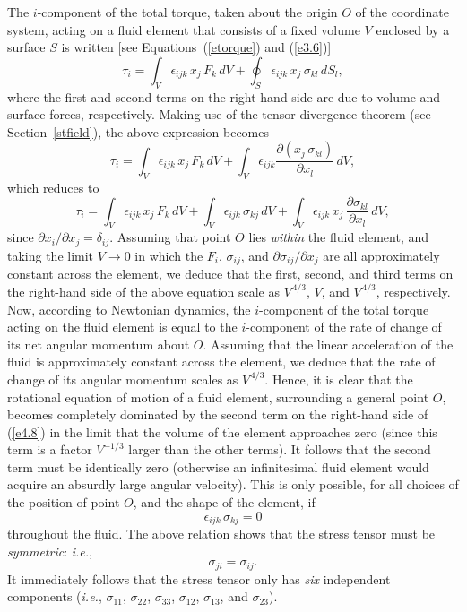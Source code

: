  The $i$-component of the total torque, taken about the origin $O$ of the coordinate system, acting on a fluid element that consists of
 a fixed volume $V$ enclosed by a surface $S$ is written  [see Equations~(\ref{etorque}) and (\ref{e3.6})]
 \begin{equation}
 \tau_i =\int_V \epsilon_{ijk}\,x_j\,F_k\,dV + \oint_S\epsilon_{ijk}\,x_j\,\sigma_{kl}\,dS_l,
 \end{equation}
 where the first and second terms on the right-hand side are due to volume and surface forces, respectively. 
Making use of the tensor divergence theorem (see Section~\ref{stfield}),
 the above expression becomes
 \begin{equation}
 \tau_i = \int_V \epsilon_{ijk}\,x_j\,F_k\,dV + \int_V \epsilon_{ijk}\frac{\partial (x_j\,\sigma_{kl})}{\partial x_l}\,dV,
 \end{equation}
 which reduces to
 \begin{equation}\label{e4.8}
 \tau_i = \int_V \epsilon_{ijk}\,x_j\,F_k\,dV + \int_V \epsilon_{ijk}\,\sigma_{kj}\,dV+ \int_V\epsilon_{ijk}\,x_j\,\frac{\partial \sigma_{kl}}{\partial x_l}\,dV,
 \end{equation}
 since $\partial x_i/\partial x_j = \delta_{ij}$. Assuming that point $O$ lies {\em within}\/ the fluid element, and taking the
 limit $V\rightarrow 0$ in which the $F_i$, $\sigma_{ij}$, and $\partial \sigma_{ij}/\partial x_j$ are all approximately
 constant across the element, we deduce that the first, second, and third terms on the right-hand
 side of the above equation scale as $V^{\,4/3}$, $V$, and $V^{
 \,4/3}$, respectively. Now, according to Newtonian dynamics, the $i$-component
 of the total torque acting on the fluid element is equal to the $i$-component of the
 rate of change of its net angular momentum about $O$. Assuming that the linear acceleration of the fluid 
 is approximately constant across the element, we deduce that the rate of change of its angular momentum scales as $V^{\,4/3}$. 
 Hence, it is clear that 
 the rotational equation of motion of a  fluid element, surrounding a general point $O$, becomes completely dominated
 by the second term on the right-hand side of (\ref{e4.8}) in the limit that the volume of the element approaches zero (since
 this term is a factor $V^{-1/3}$ larger than the other terms). It follows that the second term must be identically zero (otherwise
an   infinitesimal fluid element would acquire  an absurdly large angular velocity).
 This is only possible, for all choices of the position of point $O$, and the shape of the element, if
 \begin{equation}
 \epsilon_{ijk}\,\sigma_{kj} = 0
 \end{equation}
 throughout the fluid. 
 The above relation shows that the stress tensor must be {\em symmetric}: {\em i.e.},
 \begin{equation}
 \sigma_{ji} = \sigma_{ij}.
 \end{equation}
 It immediately follows that the stress tensor only has {\em six}\/ independent components ({\em i.e.}, $\sigma_{11}$, $\sigma_{22}$, $\sigma_{33}$, $\sigma_{12}$, $\sigma_{13}$, and $\sigma_{23}$). 
 
